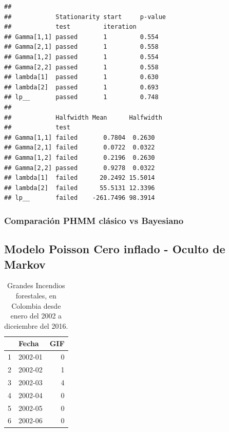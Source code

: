 \documentclass[a4paper]{article}\usepackage[]{graphicx}\usepackage[]{color}
\makeatletter
\newenvironment{kframe}{%
 \def\at@end@of@kframe{}%
 \ifinner\ifhmode%
  \def\at@end@of@kframe{\end{minipage}}%
  \begin{minipage}{\columnwidth}%
 \fi\fi%
 \def\FrameCommand##1{\hskip\@totalleftmargin \hskip-\fboxsep
 \colorbox{shadecolor}{##1}\hskip-\fboxsep
     \hskip-\linewidth \hskip-\@totalleftmargin \hskip\columnwidth}%
 \MakeFramed {\advance\hsize-\width
   \@totalleftmargin\z@ \linewidth\hsize
   \@setminipage}}%
 {\par\unskip\endMakeFramed%
 \at@end@of@kframe}
\newenvironment{knitrout}{}{} %
\makeatother
\begin{document}
\begin{knitrout}
\color{fgcolor}\begin{kframe}
\begin{verbatim}
##                                          
##            Stationarity start     p-value
##            test         iteration        
## Gamma[1,1] passed       1         0.554  
## Gamma[2,1] passed       1         0.558  
## Gamma[1,2] passed       1         0.554  
## Gamma[2,2] passed       1         0.558  
## lambda[1]  passed       1         0.630  
## lambda[2]  passed       1         0.693  
## lp__       passed       1         0.748  
##                                         
##            Halfwidth Mean      Halfwidth
##            test                         
## Gamma[1,1] failed       0.7804  0.2630  
## Gamma[2,1] failed       0.0722  0.0322  
## Gamma[1,2] failed       0.2196  0.2630  
## Gamma[2,2] passed       0.9278  0.0322  
## lambda[1]  failed      20.2492 15.5014  
## lambda[2]  failed      55.5131 12.3396  
## lp__       failed    -261.7496 98.3914
\end{verbatim}
\end{kframe}
\end{knitrout}

\subsubsection{Comparación PHMM clásico vs Bayesiano}




\subsection{Modelo Poisson Cero inflado - Oculto de Markov}




\begin{table}[ht]
\centering
\begin{tabular}{rlr}
  \hline
 & Fecha & GIF \\ 
  \hline
1 & 2002-01 &   0 \\ 
  2 & 2002-02 &   1 \\ 
  3 & 2002-03 &   4 \\ 
  4 & 2002-04 &   0 \\ 
  5 & 2002-05 &   0 \\ 
  6 & 2002-06 &   0 \\ 
   \hline
\end{tabular}
\caption{Grandes Incendios forestales, en Colombia desde enero del 2002 a diceiembre del 2016.} 
\end{table}
\end{document}
